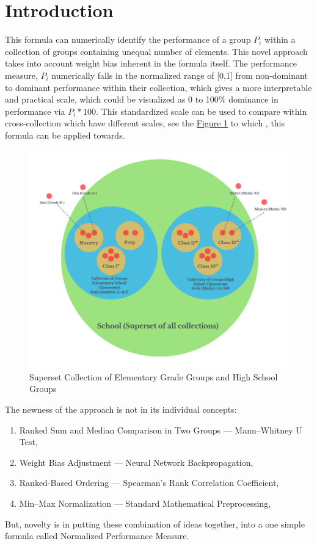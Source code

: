 \documentclass[a4paper,fleqn,review]{cas-sc}
\begin{document}
\section{Introduction}
This formula can numerically identify the performance of a group $P_i$ within a collection of groups containing unequal number of elements. This novel approach takes into account weight bias inherent in the formula itself. The performance measure, $P_i$ numerically falls in the normalized range of [0,1] from non-dominant to dominant performance within their collection, which gives a more interpretable and practical scale, which could be visualized as 0 to 100\% dominance in performance via $P_i * 100$. 
This standardized scale can be used to compare within cross-collection which have different scales, see the \hyperref[fig:superset-collection]{Figure 1} to which , this formula can be applied towards.
\begin{figure}
	\centering   
    \includegraphics [scale=0.5]{superset_collection.png}
    \caption{Superset Collection of Elementary Grade Groups and High School Groups}
    \label{fig:superset-collection}
\end{figure}

The newness of the approach is not in its individual concepts:
\begin{enumerate}
\item Ranked Sum and Median Comparison in Two Groups — Mann–Whitney U Test, \cite{mann1947test}
\item Weight Bias Adjustment — Neural Network Backpropagation, \cite{goodfellow2016deep}
\item Ranked-Based Ordering — Spearman’s Rank Correlation Coefficient, \cite{spearman1904proof}
\item Min–Max Normalization — Standard Mathematical Preprocessing, \cite{han2011data}
\end{enumerate}
But, novelty is in putting these combination of ideas together, into a one simple formula called Normalized Performance Measure.
\end{document}
